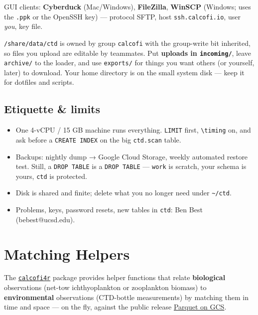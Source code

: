 \documentclass[
  letterpaper,
  DIV=11,
  numbers=noendperiod]{scrreprt}
\providecommand{\tightlist}{%
  \setlength{\itemsep}{0pt}\setlength{\parskip}{0pt}}
\begin{document}
GUI clients: \textbf{Cyberduck} (Mac/Windows), \textbf{FileZilla},
\textbf{WinSCP} (Windows; uses the \texttt{.ppk} or the OpenSSH key) ---
protocol SFTP, host \texttt{ssh.calcofi.io}, user \emph{you}, key file.

\texttt{/share/data/ctd} is owned by group \texttt{calcofi} with the
group-write bit inherited, so files you upload are editable by
teammates. Put \textbf{uploads in \texttt{incoming/}}, leave
\texttt{archive/} to the loader, and use \texttt{exports/} for things
you want others (or yourself, later) to download. Your home directory is
on the small system disk --- keep it for dotfiles and scripts.

\section{Etiquette \& limits}\label{sec-etiquette}

\begin{itemize}
\tightlist
\item
  One 4-vCPU / 15 GB machine runs everything. \texttt{LIMIT} first,
  \texttt{\textbackslash{}timing} on, and ask before a
  \texttt{CREATE\ INDEX} on the big \texttt{ctd.scan} table.
\item
  Backups: nightly dump → Google Cloud Storage, weekly automated restore
  test. Still, a \texttt{DROP\ TABLE} is a \texttt{DROP\ TABLE} ---
  \texttt{work} is scratch, your schema is yours, \texttt{ctd} is
  protected.
\item
  Disk is shared and finite; delete what you no longer need under
  \texttt{\textasciitilde{}/ctd}.
\item
  Problems, keys, password resets, new tables in \texttt{ctd}: Ben Best
  (bebest@ucsd.edu).
\end{itemize}


\chapter{Matching Helpers}\label{matching-helpers}

The \href{https://calcofi.io/calcofi4r}{\texttt{calcofi4r}} package
provides helper functions that relate \textbf{biological} observations
(net-tow ichthyoplankton or zooplankton biomass) to
\textbf{environmental} observations (CTD-bottle measurements) by
matching them in time and space --- on the fly, against the public
release \hyperref[data-access]{Parquet on GCS}.
\end{document}
